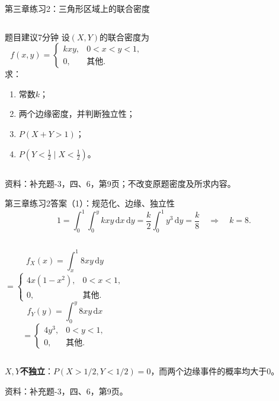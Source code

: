 \documentclass[aspectratio=169,10pt]{beamer}
\newcommand{\dd}{\,\mathrm{d}}
\newcommand{\source}[1]{\vfill{\color{Muted}\fontsize{6.5}{8}\selectfont 资料：#1\par}}
\begin{document}
\begin{frame}[t]{第三章练习2：三角形区域上的联合密度}
\begin{columns}[T]
\begin{block}{题目\quad 建议7分钟}
设$(X,Y)$的联合密度为
\[
f(x,y)=\begin{cases}kxy,&0<x<y<1,\\0,&\text{其他}.\end{cases}
\]
求：
\begin{enumerate}
\item 常数$k$；
\item 两个边缘密度，并判断独立性；
\item $P(X+Y>1)$；
\item $P(Y<\tfrac12\mid X<\tfrac12)$。
\end{enumerate}
\end{block}
\centering
{}
\end{columns}
\source{补充题-3，四、6，第9页；不改变原题密度及所求内容。}
\end{frame}

\begin{answerframe}{第三章练习2答案（1）：规范化、边缘、独立性}
\[
1=\int_0^1\!\int_0^y kxy\dd x\dd y
=\frac{k}{2}\int_0^1y^3\dd y=\frac{k}{8}\quad\Longrightarrow\quad\boxed{k=8}.
\]
\begin{columns}[T]
\[
f_X(x)=\int_x^1 8xy\dd y
\]
\[
=\begin{cases}4x(1-x^2),&0<x<1,\\0,&\text{其他}.\end{cases}
\]
\[
f_Y(y)=\int_0^y8xy\dd x
\]
\[
=\begin{cases}4y^3,&0<y<1,\\0,&\text{其他}.\end{cases}
\]
\end{columns}
$X,Y$\textbf{不独立}：$P(X>1/2,Y<1/2)=0$，而两个边缘事件的概率均大于0。
\source{补充题-3，四、6，第9页。}
\end{answerframe}
\end{document}
